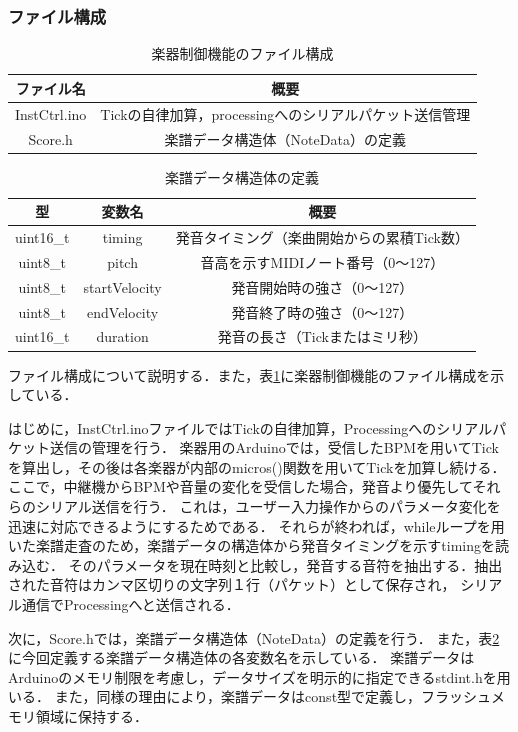 \documentclass[lualatex,book,paper=a4paper,jafontsize=11.5pt,jafontscale=1.05]{jlreq}
\begin{document}
\subsubsection{ファイル構成}
\begin{table}[bt]
    \vspace{-1em}
    \caption{楽器制御機能のファイル構成}
    \centering
    \label{tab:file2}
    \begin{tabular}{|c|c|}
    \hline
    ファイル名 & 概要\\
    \hline
    InstCtrl.ino & Tickの自律加算，processingへのシリアルパケット送信管理\\
    \hline
    Score.h & 楽譜データ構造体（NoteData）の定義\\
    \hline
    \end{tabular}
\end{table}

\begin{table}[bt]
    \vspace{-1em}
    \caption{楽譜データ構造体の定義}
    \centering
    \label{tab:deta}
    \begin{tabular}{|c|c|c|}
    \hline
    型 & 変数名 & 概要 \\
    \hline
    uint16\_t & timing & 発音タイミング（楽曲開始からの累積Tick数） \\
    \hline
    uint8\_t & pitch & 音高を示すMIDIノート番号（0〜127） \\
    \hline
    uint8\_t & startVelocity & 発音開始時の強さ（0〜127） \\
    \hline
    uint8\_t & endVelocity & 発音終了時の強さ（0〜127） \\
    \hline
    uint16\_t & duration & 発音の長さ（Tickまたはミリ秒） \\
    \hline
    \end{tabular}
\end{table}

ファイル構成について説明する．また，表\ref{tab:file2}に楽器制御機能のファイル構成を示している．\par
はじめに，InstCtrl.inoファイルではTickの自律加算，Processingへのシリアルパケット送信の管理を行う．
楽器用のArduinoでは，受信したBPMを用いてTickを算出し，その後は各楽器が内部のmicros()関数を用いてTickを加算し続ける．
ここで，中継機からBPMや音量の変化を受信した場合，発音より優先してそれらのシリアル送信を行う．
これは，ユーザー入力操作からのパラメータ変化を迅速に対応できるようにするためである．
それらが終われば，whileループを用いた楽譜走査のため，楽譜データの構造体から発音タイミングを示すtimingを読み込む．
そのパラメータを現在時刻と比較し，発音する音符を抽出する．抽出された音符はカンマ区切りの文字列１行（パケット）として保存され，
シリアル通信でProcessingへと送信される．\par
次に，Score.hでは，楽譜データ構造体（NoteData）の定義を行う．
また，表\ref{tab:deta}に今回定義する楽譜データ構造体の各変数名を示している．
楽譜データはArduinoのメモリ制限を考慮し，データサイズを明示的に指定できるstdint.hを用いる．
また，同様の理由により，楽譜データはconst型で定義し，フラッシュメモリ領域に保持する．
\end{document}
